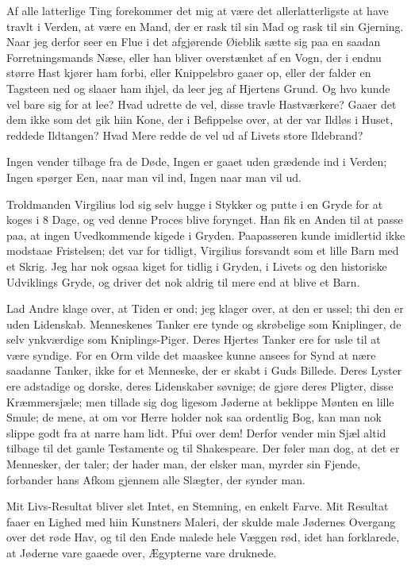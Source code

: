 \documentclass[12pt,a4paper]{article}
\begin{document}
Af alle latterlige Ting forekommer det mig at være det allerlatterligste at have travlt i Verden, at være en Mand, der er rask til sin Mad og rask til sin Gjerning. Naar jeg derfor seer en Flue i det afgjørende Øieblik sætte sig paa en saadan Forretningsmands Næse, eller han bliver overstænket af en Vogn, der i endnu større Hast kjører ham forbi, eller Knippelsbro gaaer op, eller der falder en Tagsteen ned og slaaer ham ihjel, da leer jeg af Hjertens Grund. Og hvo kunde vel bare sig for at lee? Hvad udrette de vel, disse travle Hastværkere? Gaaer det dem ikke som det gik hiin Kone, der i Befippelse over, at der var Ildløs i Huset, reddede Ildtangen? Hvad Mere redde de vel ud af Livets store Ildebrand?

Ingen vender tilbage fra de Døde, Ingen er gaaet uden grædende ind i Verden; Ingen spørger Een, naar man vil ind, Ingen naar man vil ud.

Troldmanden Virgilius lod sig selv hugge i Stykker og putte i en Gryde for at koges i 8 Dage, og ved denne Proces blive forynget. Han fik en Anden til at passe paa, at ingen Uvedkommende kigede i Gryden. Paapasseren kunde imidlertid ikke modstaae Fristelsen; det var for tidligt, Virgilius forsvandt som et lille Barn med et Skrig. Jeg har nok ogsaa kiget for tidlig i Gryden, i Livets og den historiske Udviklings Gryde, og driver det nok aldrig til mere end at blive et Barn.

Lad Andre klage over, at Tiden er ond; jeg klager over, at den er ussel; thi den er uden Lidenskab. Menneskenes Tanker ere tynde og skrøbelige som Kniplinger, de selv ynkværdige som Kniplings-Piger. Deres Hjertes Tanker ere for usle til at være syndige. For en Orm vilde det maaskee kunne ansees for Synd at nære saadanne Tanker, ikke for et Menneske, der er skabt i Guds Billede. Deres Lyster ere adstadige og dorske, deres Lidenskaber søvnige; de gjøre deres Pligter, disse Kræmmersjæle; men tillade sig dog ligesom Jøderne at beklippe Mønten en lille Smule; de mene, at om vor Herre holder nok saa ordentlig Bog, kan man nok slippe godt fra at narre ham lidt. Pfui over dem! Derfor vender min Sjæl altid tilbage til det gamle Testamente og til Shakespeare. Der føler man dog, at det er Mennesker, der taler; der hader man, der elsker man, myrder sin Fjende, forbander hans Afkom gjennem alle Slægter, der synder man.

Mit Livs-Resultat bliver slet Intet, en Stemning, en enkelt Farve. Mit Resultat faaer en Lighed med hiin Kunstners Maleri, der skulde male Jødernes Overgang over det røde Hav, og til den Ende malede hele Væggen rød, idet han forklarede, at Jøderne vare gaaede over, Ægypterne vare druknede.
\end{document}
